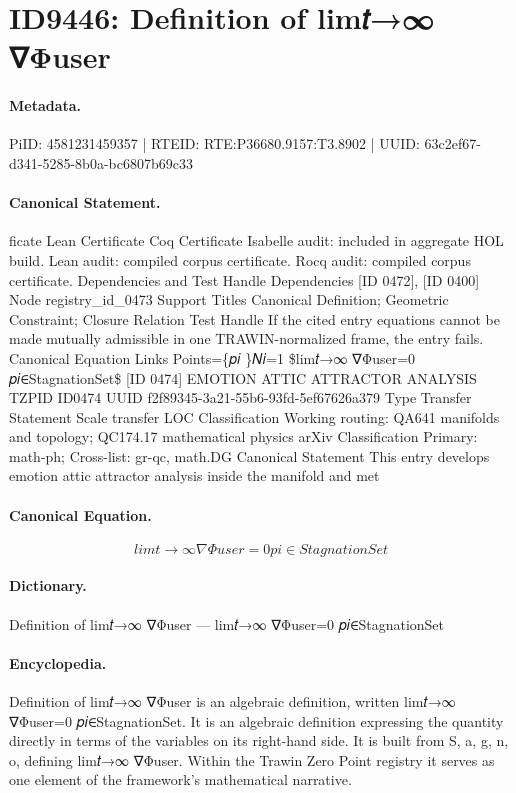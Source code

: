 \section*{ID9446: Definition of lim𝑡→∞ ∇Φuser}
\paragraph{Metadata.}
PiID: 4581231459357 | RTEID: RTE:P36680.9157:T3.8902 | UUID: 63c2ef67-d341-5285-8b0a-bc6807b69c33

\paragraph{Canonical Statement.}
ficate Lean Certificate Coq Certificate Isabelle audit: included in aggregate HOL build. Lean audit: compiled corpus certificate. Rocq audit: compiled corpus certificate. Dependencies and Test Handle Dependencies [ID 0472], [ID 0400] Node registry\_id\_0473 Support Titles Canonical Definition; Geometric Constraint; Closure Relation Test Handle If the cited entry equations cannot be made mutually admissible in one TRAWIN-normalized frame, the entry fails. Canonical Equation Links Points=\{𝑝𝑖 \}𝑁𝑖=1 \$lim𝑡→∞ ∇Φuser=0 𝑝𝑖∈StagnationSet\$ [ID 0474] EMOTION ATTIC ATTRACTOR ANALYSIS TZPID ID0474 UUID f2f89345-3a21-55b6-93fd-5ef67626a379 Type Transfer Statement Scale transfer LOC Classification Working routing: QA641 manifolds and topology; QC174.17 mathematical physics arXiv Classification Primary: math-ph; Cross-list: gr-qc, math.DG Canonical Statement This entry develops emotion attic attractor analysis inside the manifold and met

\paragraph{Canonical Equation.}
\[
lim𝑡→∞ ∇Φuser=0 𝑝𝑖∈StagnationSet
\]

\paragraph{Dictionary.}
Definition of lim𝑡→∞ ∇Φuser — lim𝑡→∞ ∇Φuser=0 𝑝𝑖∈StagnationSet

\paragraph{Encyclopedia.}
Definition of lim𝑡→∞ ∇Φuser is an algebraic definition, written lim𝑡→∞ ∇Φuser=0 𝑝𝑖∈StagnationSet. It is an algebraic definition expressing the quantity directly in terms of the variables on its right-hand side. It is built from S, a, g, n, o, defining lim𝑡→∞ ∇Φuser. Within the Trawin Zero Point registry it serves as one element of the framework's mathematical narrative.
